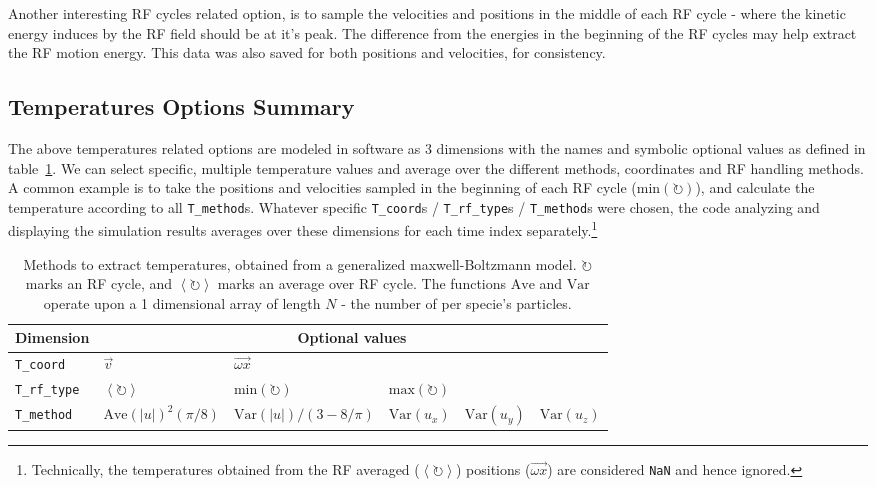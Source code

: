 Another interesting RF cycles related option, is to sample the velocities and positions in the middle of each RF cycle - where the kinetic energy induces by the RF field should be at it's peak. The difference from the energies in the beginning of the RF cycles may help extract the RF motion energy. This data was also saved for both positions and velocities, for consistency.

\subsection{Temperatures Options Summary}\label{ssec:T-options-summery}

The above temperatures related options are modeled in software as 3 dimensions with the names and symbolic optional values as defined in table~\ref{tbl:T_methods}. We can select specific, multiple temperature values and average over the different methods, coordinates and RF handling methods. A common example is to take the positions and velocities sampled in the beginning of each RF cycle ($\mathrm{min}\left(\circlearrowright\right)$), and calculate the temperature according to all \texttt{T\_method}s. Whatever specific \texttt{T\_coord}s / \texttt{T\_rf\_type}s / \texttt{T\_method}s were chosen, the code analyzing and displaying the simulation results averages over these dimensions for each time index separately.\footnote{Technically, the temperatures obtained from the RF averaged ($\left\langle\circlearrowright\right\rangle$) positions ($\overrightarrow{\omega x}$) are considered \texttt{NaN} and hence ignored.}

\begin{table}
\begin{tabular}{l||l|l|l|l|l}
Dimension   & \multicolumn{5}{c}{Optional values}\\
\hline\hline
 \texttt{T\_coord}   & $\vec{v}$                                    & \multicolumn{2}{l}{$\overrightarrow{\omega x}$} \\
\hline
\texttt{T\_rf\_type} & $\left\langle\circlearrowright\right\rangle$ & $\mathrm{min}\left(\circlearrowright\right)$ & \multicolumn{2}{l}{$\mathrm{max}\left(\circlearrowright\right)$} \\
\hline
\texttt{T\_method}  & $\mathrm{Ave}\left(|u|\right)^2(\pi/8)$      & $\mathrm{Var}\left(|u|\right)/(3 - 8/\pi)$   & $\mathrm{Var}\left(u_x\right)$               & $\mathrm{Var}\left(u_y\right)$ & $\mathrm{Var}\left(u_z\right)$ \\
\hline
\end{tabular}
\caption{Methods to extract temperatures, obtained from a generalized maxwell-Boltzmann model. $\circlearrowright$ marks an RF cycle, and $\left\langle\circlearrowright\right\rangle$ marks an average over RF cycle. The functions $\mathrm{Ave}$ and $\mathrm{Var}$ operate upon a 1 dimensional array of length $N$ - the number of per specie's particles.}
\label{tbl:T_methods}
\end{table}

